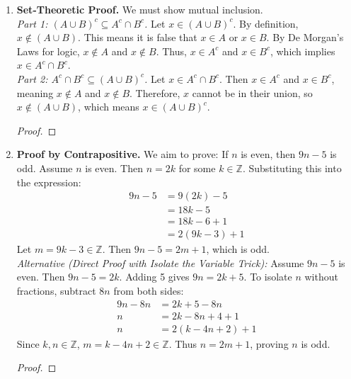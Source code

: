 \documentclass[11pt]{article}
\renewcommand{\qedsymbol}{$\blacksquare$}
\begin{document}
\begin{enumerate}
    \item \textbf{Set-Theoretic Proof.} We must show mutual inclusion. \\
    \textit{Part 1: $(A \cup B)^c \subseteq A^c \cap B^c$.} Let $x \in (A \cup B)^c$. By definition, $x \notin (A \cup B)$. This means it is false that $x \in A$ or $x \in B$. By De Morgan's Laws for logic, $x \notin A$ and $x \notin B$. Thus, $x \in A^c$ and $x \in B^c$, which implies $x \in A^c \cap B^c$. \\
    \textit{Part 2: $A^c \cap B^c \subseteq (A \cup B)^c$.} Let $x \in A^c \cap B^c$. Then $x \in A^c$ and $x \in B^c$, meaning $x \notin A$ and $x \notin B$. Therefore, $x$ cannot be in their union, so $x \notin (A \cup B)$, which means $x \in (A \cup B)^c$.
    \begin{proof}\renewcommand{\qedsymbol}{$\blacksquare$}\end{proof}

    \item \textbf{Proof by Contrapositive.} We aim to prove: If $n$ is even, then $9n - 5$ is odd. Assume $n$ is even. Then $n = 2k$ for some $k \in \mathbb{Z}$. Substituting this into the expression:
    \begin{align*}
        9n - 5 &= 9(2k) - 5 \\
               &= 18k - 5 \\
               &= 18k - 6 + 1 \\
               &= 2(9k - 3) + 1
    \end{align*}
    Let $m = 9k - 3 \in \mathbb{Z}$. Then $9n - 5 = 2m + 1$, which is odd. \\
    \textit{Alternative (Direct Proof with Isolate the Variable Trick):} Assume $9n - 5$ is even. Then $9n - 5 = 2k$. Adding 5 gives $9n = 2k + 5$. To isolate $n$ without fractions, subtract $8n$ from both sides:
    \begin{align*}
        9n - 8n &= 2k + 5 - 8n \\
        n &= 2k - 8n + 4 + 1 \\
        n &= 2(k - 4n + 2) + 1
    \end{align*}
    Since $k, n \in \mathbb{Z}$, $m = k - 4n + 2 \in \mathbb{Z}$. Thus $n = 2m + 1$, proving $n$ is odd.
    \begin{proof}\renewcommand{\qedsymbol}{$\blacksquare$}\end{proof}


\end{enumerate}
\end{document}
